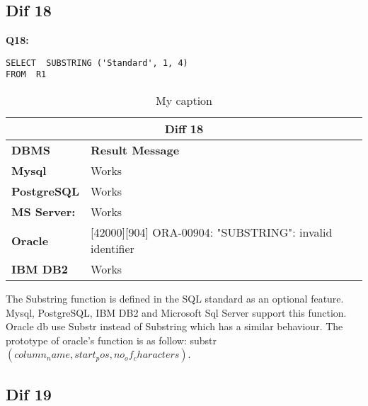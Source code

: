\subsection{Dif 18}

\begin{mdframed}[backgroundcolor=gray!20] 
\textbf{Q18:}
\begin{lstlisting}
SELECT  SUBSTRING ('Standard', 1, 4)
FROM  R1
\end{lstlisting}
\end{mdframed} 

\begin{table}[h]
\centering
\caption{My caption}
\label{my-label}
\begin{tabular}{|p{2cm}|p{12cm}|}
\hline
\multicolumn{2}{|c|}{\textbf{Diff 18}}                                                                       \\ \hline
\textbf{DBMS}                              & \textbf{Result Message}                                         \\ \hline
{\color[HTML]{333333} \textbf{Mysql}}      & {\color[HTML]{333333} Works}                                    \\ \hline
{\color[HTML]{333333} \textbf{PostgreSQL}} & {\color[HTML]{333333} Works}                                    \\ \hline
{\color[HTML]{333333} \textbf{MS Server:}} & {\color[HTML]{333333} Works}                                    \\ \hline
\textbf{Oracle}                            & {[}42000{]}{[}904{]} ORA-00904: "SUBSTRING": invalid identifier \\ \hline
\textbf{IBM DB2}                           & Works                                                           \\ \hline
\end{tabular}
\end{table}

The Substring function is defined in the SQL standard as an optional feature. Mysql, PostgreSQL, IBM DB2 and Microsoft Sql Server support this function. Oracle db use Substr instead of Substring which has a similar behaviour. The prototype of oracle’s function is as follow: substr $(column_name, start_pos , no_of_characters)$. 


\subsection{Dif 19}

